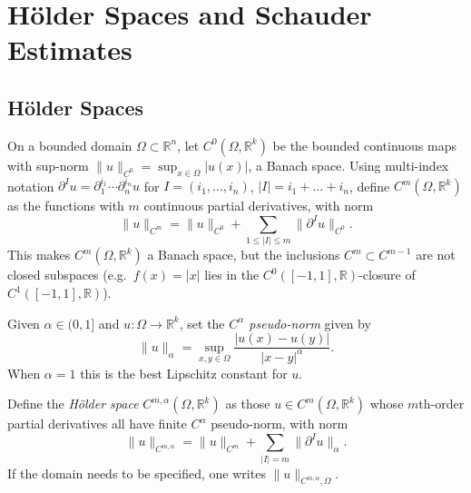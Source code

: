 \section{Hölder Spaces and Schauder Estimates}

\subsection{Hölder Spaces}

\begin{definition}
  \label{def:pet-ch11-cm-norm}
  On a bounded domain $\Omega\subset\mathbb{R}^n$, let
  $C^0(\Omega,\mathbb{R}^k)$ be the bounded continuous maps with sup-norm
  $\|u\|_{C^0}=\sup_{x\in\Omega}|u(x)|$, a Banach space. Using multi-index
  notation $\partial^Iu=\partial_1^{i_1}\cdots\partial_n^{i_n}u$ for
  $I=(i_1,\dots,i_n)$, $|I|=i_1+\dots+i_n$, define $C^m(\Omega,\mathbb{R}^k)$ as
  the functions with $m$ continuous partial derivatives, with norm
  \[
    \|u\|_{C^m}=\|u\|_{C^0}+\sum_{1\le|I|\le m}\|\partial^Iu\|_{C^0}.
  \]
  This makes $C^m(\Omega,\mathbb{R}^k)$ a Banach space, but the inclusions
  $C^m\subset C^{m-1}$ are not closed subspaces (e.g.\ $f(x)=|x|$ lies in the
  $C^0([-1,1],\mathbb{R})$-closure of $C^1([-1,1],\mathbb{R})$).
\end{definition}

\begin{definition}
  \label{def:pet-ch11-holder-pseudonorm}
  Given $\alpha\in(0,1]$ and $u:\Omega\to\mathbb{R}^k$, set the
  \emph{$C^\alpha$ pseudo-norm}
  given by
  \[
    \|u\|_\alpha=\sup_{x,y\in\Omega}\frac{|u(x)-u(y)|}{|x-y|^\alpha}.
  \]
  When $\alpha=1$ this is the best Lipschitz constant for $u$.
\end{definition}

\begin{definition}
  \label{def:pet-ch11-holder-space}
  Define the \emph{Hölder space} $C^{m,\alpha}(\Omega,\mathbb{R}^k)$ as those
  $u\in C^m(\Omega,\mathbb{R}^k)$ whose $m$th-order partial derivatives all have
  finite $C^\alpha$ pseudo-norm, with norm
  \[
    \|u\|_{C^{m,\alpha}}=\|u\|_{C^m}+\sum_{|I|=m}\|\partial^Iu\|_\alpha.
  \]
  If the domain needs to be specified, one writes $\|u\|_{C^{m,\alpha},\Omega}$.
\end{definition}

